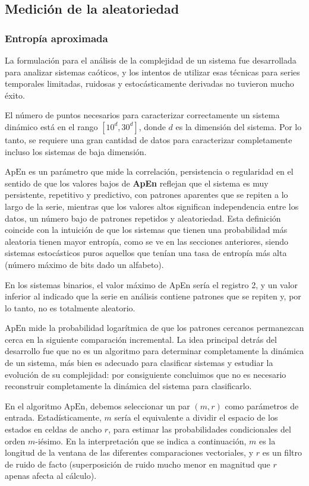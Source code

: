\documentclass[a4paper,12pt]{article}
\begin{document}
\subsection{Medición de la aleatoriedad}
\subsubsection{Entropía aproximada} 

La formulación para el análisis de la complejidad de un sistema fue desarrollada para analizar sistemas caóticos, y los intentos de utilizar esas técnicas para series temporales limitadas, ruidosas y estocásticamente derivadas no tuvieron mucho éxito. 

El número de puntos necesarios para caracterizar correctamente un sistema dinámico está en el rango $[10^d,  30^d]$, donde $d$ es la dimensión del sistema. Por lo tanto, se requiere una gran cantidad de datos para caracterizar completamente incluso los sistemas de baja dimensión. 

$\textrm{ApEn}$ es un parámetro que mide la correlación, persistencia o regularidad en el sentido de que los valores bajos de \textbf{ApEn} reflejan que el sistema es muy persistente, repetitivo y predictivo, con patrones aparentes que se repiten a lo largo de la serie, mientras que los valores altos significan independencia entre los datos, un número bajo de patrones repetidos y aleatoriedad. Esta definición coincide con la intuición de que los sistemas que tienen una probabilidad más aleatoria tienen mayor entropía, como se ve en las secciones anteriores, siendo sistemas estocásticos puros aquellos que tenían una tasa de entropía más alta (número máximo de bits dado un alfabeto).

En los sistemas binarios, el valor máximo de ApEn sería el registro 2, y un valor inferior al indicado que la serie en análisis contiene patrones que se repiten y, por lo tanto, no es totalmente aleatorio.

$\textrm{ApEn}$ mide la probabilidad logarítmica de que los patrones cercanos permanezcan cerca en la siguiente comparación incremental. La idea principal detrás del desarrollo fue que no es un algoritmo para determinar completamente la dinámica de un sistema, más bien es adecuado para clasificar sistemas y estudiar la evolución de su complejidad: por consiguiente concluimos que no es necesario reconstruir completamente la dinámica del sistema para clasificarlo.

En el algoritmo $\textrm{ApEn}$, debemos seleccionar un par $(m, r)$ como parámetros de entrada. Estadísticamente, $m$ sería el equivalente a dividir el espacio de los estados en celdas de ancho $r$, para estimar las probabilidades condicionales del orden $m$-iésimo. En la interpretación que se indica a continuación, $m$ es la longitud de la ventana de las diferentes comparaciones vectoriales, y $r$ es un filtro de ruido de facto (superposición de ruido mucho menor en magnitud que $r$ apenas afecta al cálculo).
\end{document}
